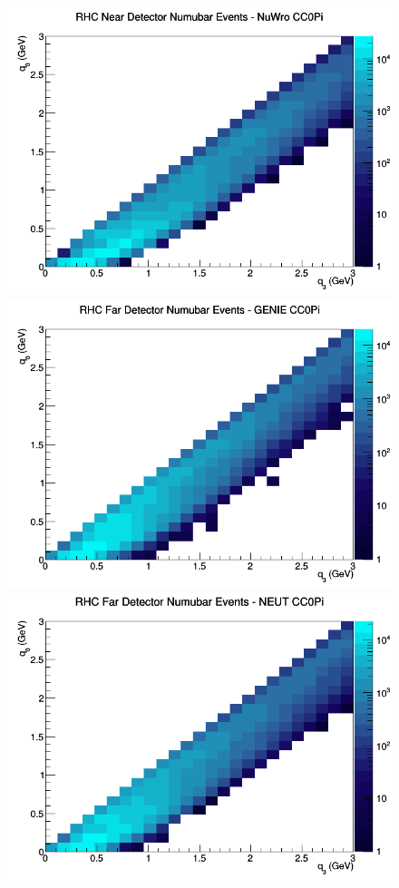 \begin{figure}[h]
\includegraphics[width=\linewidth]{q0_q3/nominal/CC0Pi_RHC_ND_numubar_q3_q0_NuWro.png}
\endminipage
\newline
{}
\includegraphics[width=\linewidth]{q0_q3/nominal/CC0Pi_RHC_FD_numubar_q3_q0_GENIE.png}
\endminipage
{}
\includegraphics[width=\linewidth]{q0_q3/nominal/CC0Pi_RHC_FD_numubar_q3_q0_NEUT.png}

\end{figure}
